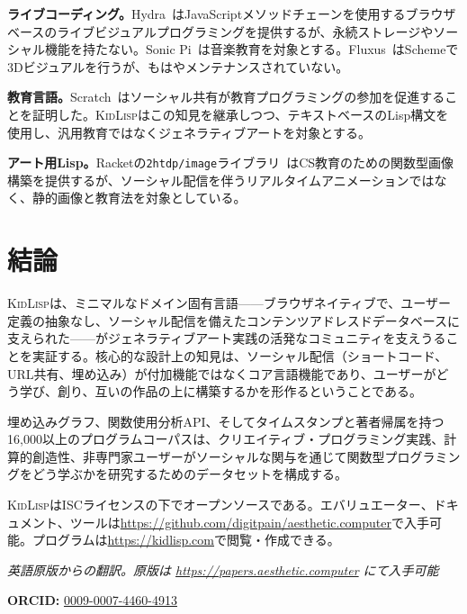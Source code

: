 \documentclass[10pt,letterpaper,twocolumn]{article}
\newcommand{\kidlisp}{\textsc{KidLisp}}
\begin{document}
\textbf{ライブコーディング。}Hydra~\citep{hydra2019}はJavaScriptメソッドチェーンを使用するブラウザベースのライブビジュアルプログラミングを提供するが、永続ストレージやソーシャル機能を持たない。Sonic Pi~\citep{aaron2016sonic}は音楽教育を対象とする。Fluxus~\citep{fluxus2007}はSchemeで3Dビジュアルを行うが、もはやメンテナンスされていない。

\textbf{教育言語。}Scratch~\citep{resnick2009scratch}はソーシャル共有が教育プログラミングの参加を促進することを証明した。\kidlisp{}はこの知見を継承しつつ、テキストベースのLisp構文を使用し、汎用教育ではなくジェネラティブアートを対象とする。

\textbf{アート用Lisp。}Racketの\texttt{2htdp/image}ライブラリ~\citep{racket2018}はCS教育のための関数型画像構築を提供するが、ソーシャル配信を伴うリアルタイムアニメーションではなく、静的画像と教育法を対象としている。

\section{結論}

\kidlisp{}は、ミニマルなドメイン固有言語——ブラウザネイティブで、ユーザー定義の抽象なし、ソーシャル配信を備えたコンテンツアドレスドデータベースに支えられた——がジェネラティブアート実践の活発なコミュニティを支えうることを実証する。核心的な設計上の知見は、ソーシャル配信（ショートコード、URL共有、埋め込み）が付加機能ではなくコア言語機能であり、ユーザーがどう学び、創り、互いの作品の上に構築するかを形作るということである。

埋め込みグラフ、関数使用分析API、そしてタイムスタンプと著者帰属を持つ16,000以上のプログラムコーパスは、クリエイティブ・プログラミング実践、計算的創造性、非専門家ユーザーがソーシャルな関与を通じて関数型プログラミングをどう学ぶかを研究するためのデータセットを構成する。

\kidlisp{}はISCライセンスの下でオープンソースである。エバリュエーター、ドキュメント、ツールは\url{https://github.com/digitpain/aesthetic.computer}で入手可能。プログラムは\url{https://kidlisp.com}で閲覧・作成できる。

\vspace{0.5em}
\noindent\textit{英語原版からの翻訳。原版は \url{https://papers.aesthetic.computer} にて入手可能}

\vspace{0.5em}
\noindent\textbf{ORCID:} \href{https://orcid.org/0009-0007-4460-4913}{0009-0007-4460-4913}



\end{document}
